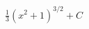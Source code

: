 \documentclass[preview]{standalone}
\begin{document}
\begin{align*}
\frac{1}{3} (x^2 + 1)^{3/2} + C
\end{align*}
\end{document}
